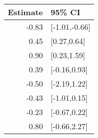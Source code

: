\begin{tabular}{rl}
  \hline
Estimate & 95\% CI \\ 
  \hline
-0.83 & [-1.01,-0.66] \\ 
  0.45 & [0.27,0.64] \\ 
  0.90 & [0.23,1.59] \\ 
  0.39 & [-0.16,0.93] \\ 
  -0.50 & [-2.19,1.22] \\ 
  -0.43 & [-1.01,0.15] \\ 
  -0.23 & [-0.67,0.22] \\ 
  0.80 & [-0.66,2.27] \\ 
   \hline
\end{tabular}

